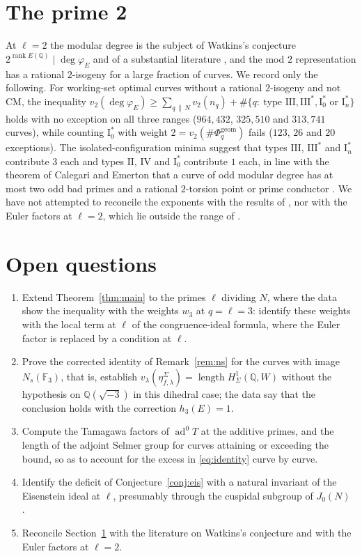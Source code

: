 \documentclass[11pt]{amsart}
\theoremstyle{definition}
\newcommand{\Q}{\mathbb{Q}}
\newcommand{\F}{\mathbb{F}}
\newcommand{\degphi}{\deg\varphi_E}
\newcommand{\Phig}{\Phi^{\mathrm{geom}}}
\newcommand{\ad}{\operatorname{ad}^0}
\newcommand{\len}{\operatorname{length}}
\begin{document}
\section{The prime 2}\label{sec:two}
At $\ell=2$ the modular degree is the subject of Watkins's conjecture $2^{\operatorname{rank}E(\Q)}\mid\degphi$ \cite{Watkins02} and of a substantial literature \cite{Dummigan06,CalegariEmerton09,Yazdani11,CaroPasten22,HatleyKundu,BKP}, and the mod $2$ representation has a rational $2$-isogeny for a large fraction of curves. We record only the following. For working-set optimal curves without a rational $2$-isogeny and not CM, the inequality $v_2(\degphi)\ge\sum_{q\,\|\,N}v_2(n_q)+\#\{q:\ \text{type }\mathrm{III},\mathrm{III}^*,\mathrm{I}_0^*\text{ or }\mathrm{I}_n^*\}$ holds with no exception on all three ranges ($964{,}432$, $325{,}510$ and $313{,}741$ curves), while counting $\mathrm{I}_0^*$ with weight $2=v_2(\#\Phig_q)$ fails ($123$, $26$ and $20$ exceptions). The isolated-configuration minima suggest that types $\mathrm{III}$, $\mathrm{III}^*$ and $\mathrm{I}_n^*$ contribute $3$ each and types $\mathrm{II}$, $\mathrm{IV}$ and $\mathrm{I}_0^*$ contribute $1$ each, in line with the theorem of Calegari and Emerton that a curve of odd modular degree has at most two odd bad primes and a rational $2$-torsion point or prime conductor \cite{CalegariEmerton09}. We have not attempted to reconcile the exponents with the results of \cite{Dummigan06,CaroPasten22,HatleyKundu,BKP}, nor with the Euler factors at $\ell=2$, which lie outside the range of \cite{DFG04}.

\section{Open questions}
\begin{enumerate}
\item Extend Theorem~\ref{thm:main} to the primes $\ell$ dividing $N$, where the data show the inequality with the weights $w_3$ at $q=\ell=3$: identify these weights with the local term at $\ell$ of the congruence-ideal formula, where the Euler factor is replaced by a condition at $\ell$.
\item Prove the corrected identity of Remark~\ref{rem:ns} for the curves with image $N_s(\F_3)$, that is, establish $v_\lambda(\eta^\Sigma_{f,\lambda})=\len H^1_\Sigma(\Q,W)$ without the hypothesis on $\Q(\sqrt{-3})$ in this dihedral case; the data say that the conclusion holds with the correction $h_3(E)=1$.
\item Compute the Tamagawa factors of $\ad T$ at the additive primes, and the length of the adjoint Selmer group for curves attaining or exceeding the bound, so as to account for the excess in \eqref{eq:identity} curve by curve.
\item Identify the deficit of Conjecture~\ref{conj:eis} with a natural invariant of the Eisenstein ideal at $\ell$, presumably through the cuspidal subgroup of $J_0(N)$ \cite{Mazur77}.
\item Reconcile Section~\ref{sec:two} with the literature on Watkins's conjecture and with the Euler factors at $\ell=2$.
\end{enumerate}
\end{document}
